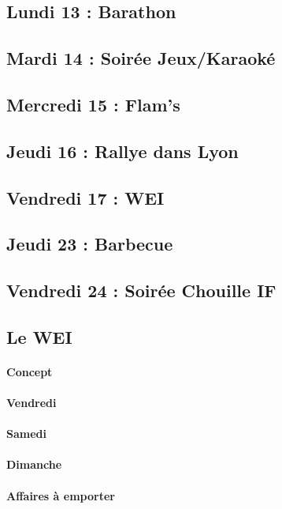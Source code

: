\begin{multicols}{2}
    \subsection{Lundi 13 : Barathon}
    
    \subsection{Mardi 14 : Soirée Jeux/Karaoké}
    
    \subsection{Mercredi 15 : Flam's}
    
    \subsection{Jeudi 16 : Rallye dans Lyon}
    
    \subsection{Vendredi 17 : WEI}
    
    \subsection{Jeudi 23 : Barbecue}
    
    \subsection{Vendredi 24 : Soirée Chouille IF }
    
    \subsection{Le WEI}
	\paragraph{Concept}
	
	\paragraph{Vendredi}
	
	\paragraph{Samedi}
	
	\paragraph{Dimanche} 
	
	\paragraph{Affaires à emporter}
	
\newpage

\end{multicols}
